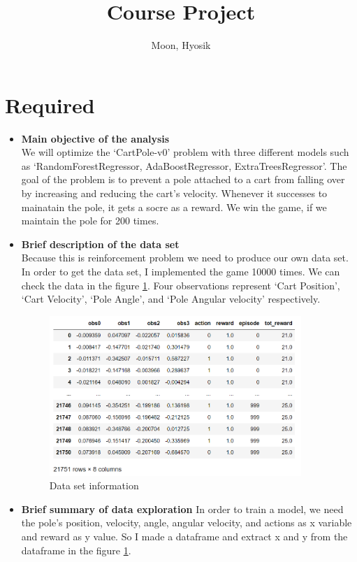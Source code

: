 \documentclass[12pt]{article}
\title{Course Project}
\author{
  Moon, Hyosik
  }
\begin{document}
\maketitle

\section{Required}

\begin{itemize}
\item \textbf{Main objective of the analysis} \\
We will optimize the `CartPole-v0' problem with three different models such as `RandomForestRegressor, AdaBoostRegressor, ExtraTreesRegressor'. The goal of the problem is to prevent a pole attached to a cart from falling over by increasing and reducing the cart's velocity. Whenever it successes to mainatain the pole, it gets a socre as a reward. We win the game, if we maintain the pole for 200 times.

\item \textbf{Brief description of the data set} \\
Because this is reinforcement problem we need to produce our own data set. In order to get the data set, I implemented the game 10000 times. We can check the data in the figure \ref{data}. Four observations represent `Cart Position', `Cart Velocity', `Pole Angle', and `Pole Angular velocity' respectively. 

\begin{figure}[H]
    \centering
    \includegraphics[width=0.9\textwidth]{figures/data.png}
    \caption{Data set information}\label{data}
\end{figure}

\item \textbf{Brief summary of data exploration}
In order to train a model, we need the pole's position, velocity, angle, angular velocity, and actions as x variable and reward as y value. So I made a dataframe and extract x and y from the dataframe in the figure \ref{data}.
    

\end{itemize}
\end{document}
